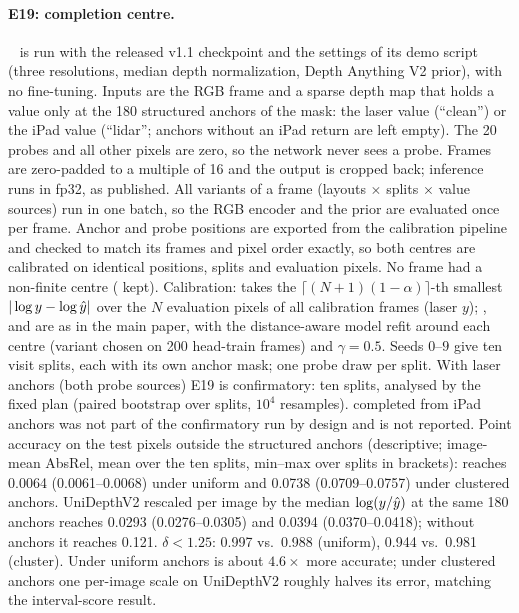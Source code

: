 \documentclass[10pt,twocolumn,letterpaper]{article}
\begin{document}
\paragraph{E19: completion centre.}
\omnidc~\cite{zuo2025omnidc} is run with the released v1.1 checkpoint and the settings of its demo script (three resolutions, median depth normalization, Depth Anything V2 prior), with no fine-tuning. Inputs are the RGB frame and a sparse depth map that holds a value only at the 180 structured anchors of the mask: the laser value (``clean'') or the iPad value (``lidar''; anchors without an iPad return are left empty). The 20 probes and all other pixels are zero, so the network never sees a probe. Frames are zero-padded to a multiple of 16 and the output is cropped back; inference runs in fp32, as published. All variants of a frame (layouts $\times$ splits $\times$ value sources) run in one batch, so the RGB encoder and the prior are evaluated once per frame. Anchor and probe positions are exported from the calibration pipeline and checked to match its frames and pixel order exactly, so both centres are calibrated on identical positions, splits and evaluation pixels. No frame had a non-finite centre (\NumArkFrames{} kept).
Calibration: \mSplitCP takes the $\lceil(N+1)(1-\alpha)\rceil$-th smallest $|\log y-\log\hat{y}|$ over the $N$ evaluation pixels of all calibration frames (laser $y$); \mDistSplit, \mDual and \mDualBoth are as in the main paper, with the distance-aware model refit around each centre (variant chosen on 200 head-train frames) and $\gamma=0.5$. Seeds $0$--$9$ give ten visit splits, each with its own anchor mask; one probe draw per split.
With laser anchors (both probe sources) E19 is confirmatory: ten splits, analysed by the fixed plan (paired bootstrap over splits, $10^4$ resamples). \omnidc completed from iPad anchors was not part of the confirmatory run by design and is not reported.
Point accuracy on the test pixels outside the structured anchors (descriptive; image-mean AbsRel, mean over the ten splits, min--max over splits in brackets): \omnidc reaches 0.0064 (0.0061--0.0068) under uniform and 0.0738 (0.0709--0.0757) under clustered anchors. UniDepthV2 rescaled per image by the median $\log(y/\hat{y})$ at the same 180 anchors reaches 0.0293 (0.0276--0.0305) and 0.0394 (0.0370--0.0418); without anchors it reaches 0.121. $\delta<1.25$: 0.997 vs.\ 0.988 (uniform), 0.944 vs.\ 0.981 (cluster). Under uniform anchors \omnidc is about $4.6\times$ more accurate; under clustered anchors one per-image scale on UniDepthV2 roughly halves its error, matching the interval-score result.
\end{document}
